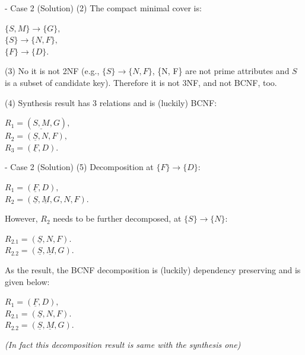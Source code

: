 \begin{frame}[fragile]{ - Case 2 (Solution)}
	(2) The compact minimal cover is:\\\vspace{5pt}
	
	$\{S, M\} \rightarrow \{G\},$\\
	$\{S\}  \rightarrow \{N, F\},$\\
	$\{F\} \rightarrow \{D\}.$\\\vspace{5pt}
	
	(3)  No it is not 2NF (e.g., $\{S\}\rightarrow\{N, F\}$, \{N, F\} are not prime attributes and $S$ is a subset of candidate key). Therefore it is not 3NF, and not BCNF, too.\\\vspace{5pt}
	
	(4) Synthesis result has 3 relations and is (luckily) BCNF: \\\vspace{5pt}
	
	$R_1 = (\underline{S,M}, G),$\\
	$R_2 = (\underline{S}, N, F),$\\
	$R_3 = (\underline{F}, D).$\\\vspace{5pt}
	
\end{frame}

\begin{frame}[fragile]{ - Case 2 (Solution)}
	(5) Decomposition at $\{F\} \rightarrow \{D\}$:\\\vspace{5pt}
	
	$R_1 = (\underline{F}, D),$\\
	$R_2 = (\underline{S}, \underline{M}, G, N, F).$\\\vspace{5pt}
	
	However, $R_2$ needs to be further decomposed, at $\{S\} \rightarrow \{N\}$:\\\vspace{5pt}
	
	$R_{2.1} = (\underline{S}, N, F).$\\
	$R_{2.2} = (\underline{S}, \underline{M}, G).$\\\vspace{5pt}
	
	As the result, the BCNF decomposition is (luckily) dependency preserving and is given below:\\\vspace{5pt}
	
	$R_1 = (\underline{F}, D),$\\
	$R_{2.1} = (\underline{S}, N, F).$\\
	$R_{2.2} = (\underline{S}, \underline{M}, G).$\\\vspace{5pt}
	
	\textit{(In fact this decomposition result is same with the synthesis one)}
\end{frame}


